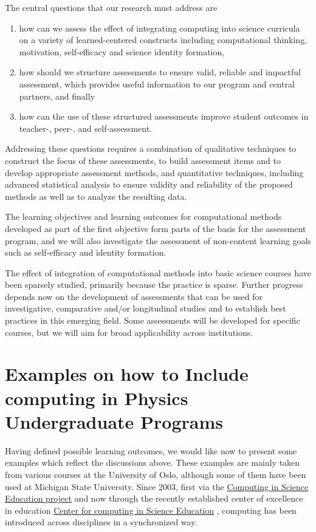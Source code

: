 \documentclass[graybox,envcountchap,sectrefs]{svmult}
\begin{document}
The central questions that our research must address are
\begin{enumerate}
\item how can we assess the effect of integrating computing  into science curricula on a variety of learned-centered constructs including computational thinking, motivation, self-efficacy and science identity formation,
\item how should we structure assessments to ensure valid, reliable and impactful assessment, which provides useful information to our program and central partners, and finally
\item how can the use of these structured assessments improve student outcomes in teacher-, peer-, and self-assessment.
\end{enumerate}


Addressing these questions requires a combination of qualitative
techniques to construct the focus of these assessments, to build
assessment items and to develop appropriate assessment methods, and
quantitative techniques, including advanced statistical analysis to
ensure validity and reliability of the proposed methods as well as to
analyze the resulting data.

The learning objectives and learning outcomes for computational
methods developed as part of the first objective form parts of the
basis for the assessment program, and we will also investigate the
assessment of non-content learning goals such as self-efficacy and
identity formation.

The effect of integration of computational methods into basic science
courses have been sparsely studied, primarily because the practice is
sparse. Further progress depends now on the development of assessments
that can be used for investigative, comparative and/or longitudinal
studies and to establish best practices in this emerging field.  Some
assessments will be developed for specific courses, but we will aim
for broad applicability across institutions.

\section{Examples on how to Include computing in Physics Undergraduate Programs}\label{sec:examples}

Having defined possible learning outcomes, we would like now to
present some examples which reflect the discussions above. These
examples are mainly taken from various courses at the University of
Oslo, although some of them have been used at Michigan State University. Since 2003, first via the
\href{{http://www.mn.uio.no/ccse/english/people/index.html}}{Computing
  in Science Education project} \cite{CSEUiO} and now through the recently
established center of excellence in education
\href{{http://www.mn.uio.no/ccse/english/}}{Center for computing in
  Science Education} \cite{CCSEUiO}, computing has been introduced across
disciplines in a synchronized way.
\end{document}
